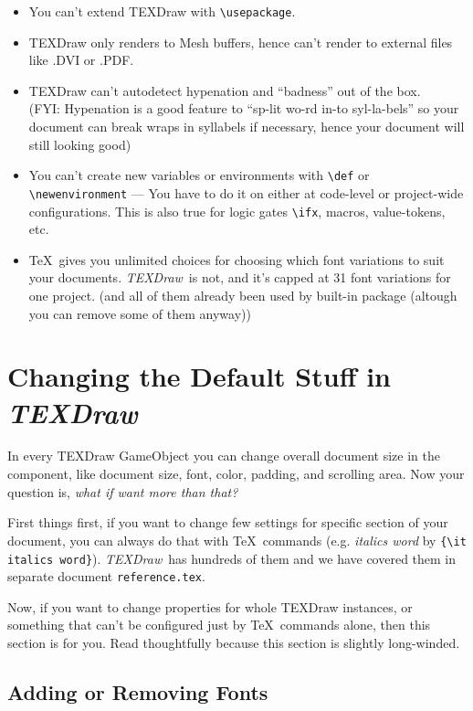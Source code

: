 \documentclass[12pt]{article}
\def\TEXDraw{\textit{TEXDraw}}
\begin{document}
 	\begin{itemize}
 		\item You can't extend TEXDraw with \verb|\usepackage|.
 		\item TEXDraw only renders to Mesh buffers, hence can't render to external files like .DVI or .PDF.
 		\item TEXDraw can't autodetect hypenation and ``badness'' out of the box.\\(FYI: Hypenation is a good feature to ``sp-lit wo-rd in-to syl-la-bels'' so your document can break wraps in syllabels if necessary, hence your document will still looking good)
 		\item You can't create new variables or environments with \verb|\def| or \verb|\newenvironment| --- You have to do it on either at code-level or project-wide configurations. This is also true for logic gates \verb|\ifx|, macros, value-tokens, etc.
 		\item \TeX\ gives you unlimited choices for choosing which font variations to suit your documents. \TEXDraw\ is not, and it's capped at 31 font variations for one project. (and all of them already been used by built-in package (altough you can remove some of them anyway))
 	\end{itemize}
 	
 	\section{Changing the Default Stuff in \TEXDraw}
 	
 	In every TEXDraw GameObject you can change overall document size in the component, like document size, font, color, padding, and scrolling area. Now your question is, {\sl what if want more than that?}
 	
 	First things first, if you want to change few settings for specific section of your document, you can always do that with \TeX\ commands (e.g. {\it italics word} by \verb|{\it italics word}|). \TEXDraw\ has hundreds of them and we have covered them in separate document \verb|reference.tex|. 
 	
 	Now, if you want to change properties for whole TEXDraw instances, or something that can't be configured just by \TeX\ commands alone, then this section is for you. Read thoughtfully because this section is slightly long-winded.
 	
 	\subsection{Adding or Removing Fonts}
 	
\end{document}
